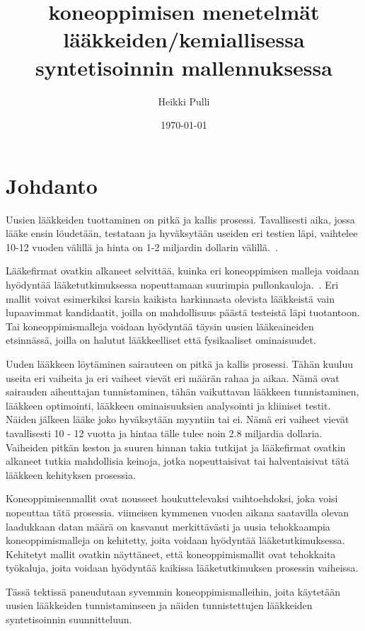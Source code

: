 \documentclass[finnish,twoside,censored,subject,sw-line]{HYthesisML}
\title{koneoppimisen menetelmät lääkkeiden/kemiallisessa syntetisoinnin mallennuksessa}
\author{Heikki Pulli}
\date{\today}
\begin{document}
\maketitle

\newpage
\mytableofcontents
\mainmatter

\chapter{Johdanto}

Uusien lääkkeiden tuottaminen on pitkä ja kallis prosessi. Tavallisesti aika, jossa
lääke ensin löudetään, testataan ja hyväksytään useiden eri testien läpi, vaihtelee
10-12 vuoden välillä ja hinta on 1-2 miljardin dollarin välillä.~\cite{EkinsSean2019Emlf}.

Lääkefirmat ovatkin alkaneet selvittää, kuinka eri koneoppimisen malleja voidaan
hyödyntää lääketutkimuksessa nopeuttamaan suurimpia pullonkauloja.~\cite{EkinsSean2019Emlf}.
Eri mallit voivat esimerkiksi karsia kaikista harkinnasta olevista lääkkeistä vain
lupaavimmat kandidaatit, joilla on mahdollisuus päästä testeistä läpi tuotantoon.
Tai koneoppimismalleja voidaan hyödyntää täysin uusien lääkeaineiden etsinnässä, joilla
on halutut lääkkeelliset että fysikaaliset ominaisuudet.~\cite{!lähde!}

Uuden lääkkeen löytäminen sairauteen on pitkä ja kallis prosessi.
Tähän kuuluu useita eri vaiheita ja eri vaiheet vievät eri määrän rahaa ja aikaa.
Nämä ovat sairauden aiheuttajan tunnistaminen, tähän vaikuttavan lääkkeen tunnistaminen, lääkkeen optimointi, lääkkeen ominaisuuksien analysointi ja kliiniset testit.
Näiden jälkeen lääke joko hyväksytään myyntiin tai ei.
Nämä eri vaiheet vievät tavallisesti 10 - 12 vuotta ja hintaa tälle tulee noin 2.8 miljardia dollaria.
Vaiheiden pitkän keston ja suuren hinnan takia tutkijat ja lääkefirmat ovatkin alkaneet tutkia mahdollisia keinoja, jotka nopeuttaisivat tai halventaisivat tätä lääkkeen kehityksen prosessia.

Koneoppimisenmallit ovat nousseet houkuttelevaksi vaihtoehdoksi, joka voisi nopeuttaa tätä prosessia.
viimeisen kymmenen vuoden aikana saatavilla olevan laadukkaan datan määrä on kasvanut merkittävästi ja uusia tehokkaampia koneoppimismalleja on kehitetty, joita voidaan hyödyntää lääketutkimuksessa.
Kehitetyt mallit ovatkin näyttäneet, että koneoppimismallit ovat tehokkaita työkaluja, joita voidaan hyödyntää kaikissa lääketutkimuksen prosessin vaiheissa.

Tässä tektissä paneudutaan syvemmin koneoppimismalleihin, joita käytetään uusien lääkkeiden tunnistaminseen ja näiden tunnistettujen lääkkeiden syntetisoinnin suunnitteluun.
\end{document}
